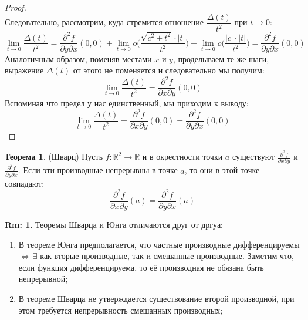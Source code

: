 \documentclass[12pt]{article}
\newcommand{\MR}{\mathbb{R}}
\theoremstyle{definition}
\newtheorem{rem}{Rm:}
\newtheorem{theorem}{Теорема}
\begin{document}
\begin{proof}
$$	$$
	Следовательно, рассмотрим, куда стремится отношение $\dfrac{\Delta(t)}{t^2}$ при $t \to 0$:
	$$
		\lim\limits_{t \to 0} \dfrac{\Delta(t)}{t^2}  = \dfrac{\partial^2 f}{\partial y \partial x}(0,0) + \lim\limits_{t\to 0}\overline{o}\bigg(\dfrac{\sqrt{c^2 + t^2}{\cdot}|t|}{t^2}\bigg) - \lim\limits_{t\to 0} \overline{o}\bigg(\dfrac{|c|{\cdot}|t|}{t^2}\bigg) = \dfrac{\partial^2 f}{\partial y \partial x}(0,0)
	$$
	Аналогичным образом, поменяв местами $x$ и $y$, проделываем те же шаги, выражение $\Delta(t)$ от этого не поменяется и следовательно мы получим:
	$$
		\lim\limits_{t \to 0} \dfrac{\Delta(t)}{t^2} = \dfrac{\partial^2 f}{\partial x \partial y}(0,0)
	$$
	Вспоминая что предел у нас единственный, мы приходим к выводу:
	$$
		\lim\limits_{t \to 0} \dfrac{\Delta(t)}{t^2} = \dfrac{\partial^2 f}{\partial x \partial y}(0,0) = \dfrac{\partial^2 f}{\partial y \partial x}(0,0)
	$$
\end{proof}
\begin{theorem}(Шварц)
	Пусть $f\colon \MR^2 \to \MR$ и в окрестности точки $a$ существуют $\tfrac{\partial^2 f}{\partial x\partial y}$ и $\tfrac{\partial^2 f}{\partial y \partial x}$. Если эти производные непрерывны в точке $a$, то они в этой точке совпадают:
	$$
		\dfrac{\partial^2 f}{\partial x \partial y}(a) = \dfrac{\partial^2 f}{\partial y \partial x}(a)
	$$
\end{theorem}
\begin{rem}
	Теоремы Шварца и Юнга отличаются друг от дргуа: 
	\begin{enumerate}[label ={(\arabic*)}]
		\item В теореме Юнга предполагается, что частные производные дифференцируемы$ \Leftrightarrow \, \exists$ как вторые производные, так и смешанные производные. Заметим что, если функция дифференцируема, то её производная не обязана быть непрерывной;
		\item В теореме Шварца не утверждается существование второй производной, при этом требуется непрерывность смешанных производных;
	\end{enumerate}
\end{rem}
\end{document}
